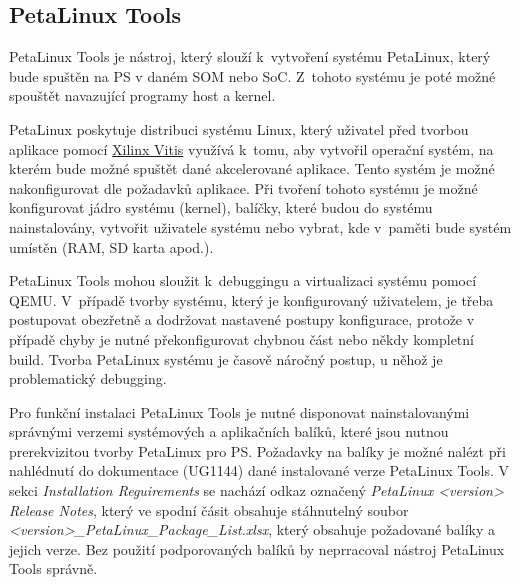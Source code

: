 \documentclass[a4paper, twoside, 11pt]{article}
\begin{document}
		\subsection{PetaLinux Tools}\label{subsec:petalinux-tools}
			PetaLinux Tools je nástroj, který slouží k~vytvoření systému PetaLinux, který bude spuštěn na PS v daném SOM nebo SoC. Z~tohoto systému je poté možné spouštět navazující programy host a kernel.\par
			PetaLinux poskytuje distribuci systému Linux, který uživatel před tvorbou aplikace pomocí \hyperref[subsec:xilinx-vitis]{Xilinx Vitis} využívá k~tomu, aby vytvořil operační systém, na kterém bude možné spuštět dané akcelerované aplikace. Tento systém je možné nakonfigurovat dle požadavků aplikace. Při tvoření tohoto systému je možné konfigurovat jádro systému (kernel), balíčky, které budou do systému nainstalovány, vytvořit uživatele systému nebo vybrat, kde v~paměti bude systém umístěn (RAM, SD karta apod.). \cite{xilinx-petalinux}\par
			PetaLinux Tools mohou sloužit k~debuggingu a virtualizaci systému pomocí QEMU. V~případě tvorby systému, který je konfigurovaný uživatelem, je třeba postupovat obezřetně a dodržovat nastavené postupy konfigurace, protože v případě chyby je nutné překonfigurovat chybnou část nebo někdy kompletní build. Tvorba PetaLinux systému je časově náročný postup, u něhož je problematický debugging.\par
			Pro funkční instalaci PetaLinux Tools je nutné disponovat nainstalovanými správnými verzemi systémových a aplikačních balíků, které jsou nutnou prerekvizitou tvorby PetaLinux pro PS. Požadavky na balíky je možné nalézt při nahlédnutí do dokumentace \cite{petalinux-tools-documentation-2022} (UG1144) dané instalované verze PetaLinux Tools. V sekci \textit{Installation Reguirements} se nachází odkaz označený \textit{PetaLinux <version> Release Notes}, který ve spodní čásit obsahuje stáhnutelný soubor \textit{<version>\_PetaLinux\_Package\_List.xlsx}, který obsahuje požadované balíky a jejich verze. Bez použití podporovaných balíků by neprracoval nástroj PetaLinux Tools správně.
\end{document}
